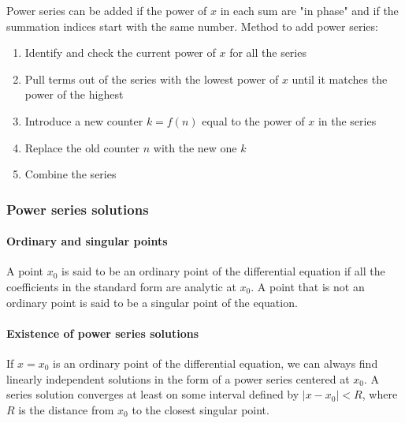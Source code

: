 \documentclass[10pt, twocolumn]{article}
\theoremstyle{definition}
\begin{document}
Power series can be added if the power of \(x\) in each sum are "in phase" and if the summation indices start with the same number.
Method to add power series:
\begin{enumerate}
  \item Identify and check the current power of \(x\) for all the series
  \item Pull terms out of the series with the lowest power of \(x\) until it matches the power of the highest
  \item Introduce a new counter \(k = f(n)\) equal to the power of \(x\) in the series
  \item Replace the old counter \(n\) with the new one \(k\)
  \item Combine the series
\end{enumerate}


\subsubsection*{Power series solutions}
\paragraph*{Ordinary and singular points}
A point \(x_0 \) is said to be an ordinary point of the differential equation if all the coefficients in the standard form are analytic at \(x_0 \).
A point that is not an ordinary point is said to be a singular point of the equation.

\paragraph*{Existence of power series solutions}
If \(x = x_0 \) is an ordinary point of the differential equation, we can always find linearly independent solutions in the form of a power series centered at \(x_0 \).
A series solution converges at least on some interval defined by \(|x - x_0 | < R\), where \(R\) is the distance from \(x_0 \) to the closest singular point.
\end{document}
